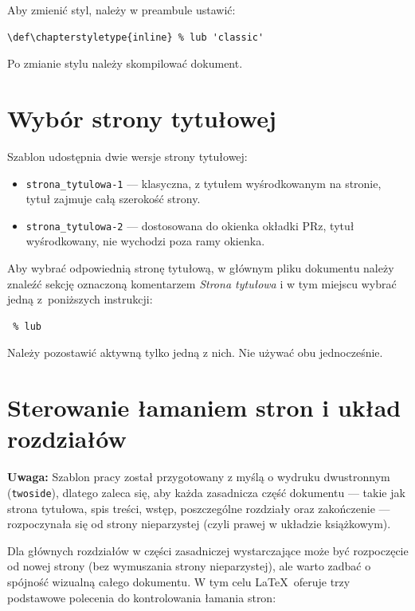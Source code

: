\documentclass[12pt,a4paper,twoside]{report}
\def\chapterstyletype{classic}  %
\theoremstyle{definition} %
\begin{document}
Aby zmienić styl, należy w preambule ustawić:

\begin{verbatim}
\def\chapterstyletype{inline} % lub 'classic'
\end{verbatim}

Po zmianie stylu należy skompilować dokument.

\section{Wybór strony tytułowej}

Szablon udostępnia dwie wersje strony tytułowej:

\begin{itemize}
    \item \texttt{strona\_tytulowa-1} — klasyczna, z tytułem wyśrodkowanym na stronie, tytuł zajmuje całą szerokość strony.
    \item \texttt{strona\_tytulowa-2} — dostosowana do okienka okładki PRz, tytuł wyśrodkowany, nie wychodzi poza ramy okienka. 
\end{itemize}

Aby wybrać odpowiednią stronę tytułową, w głównym pliku dokumentu należy znaleźć sekcję oznaczoną komentarzem \textit{Strona tytułowa} i w tym miejscu wybrać jedną z~poniższych instrukcji:

\begin{verbatim}
 % lub

\end{verbatim}
Należy pozostawić aktywną tylko jedną z nich. Nie używać obu jednocześnie.

\section{Sterowanie łamaniem stron i układ rozdziałów}


\textbf{Uwaga:} Szablon pracy został przygotowany z myślą o wydruku dwustronnym (\texttt{twoside}), dlatego zaleca się, aby każda zasadnicza część dokumentu — takie jak strona tytułowa, spis treści, wstęp, poszczególne rozdziały oraz zakończenie — rozpoczynała się od strony nieparzystej (czyli prawej w układzie książkowym).

Dla głównych rozdziałów w części zasadniczej wystarczające może być rozpoczęcie od nowej strony (bez wymuszania strony nieparzystej), ale warto zadbać o spójność wizualną całego dokumentu. W tym celu \LaTeX\ oferuje trzy podstawowe polecenia do kontrolowania łamania stron:
\end{document}
